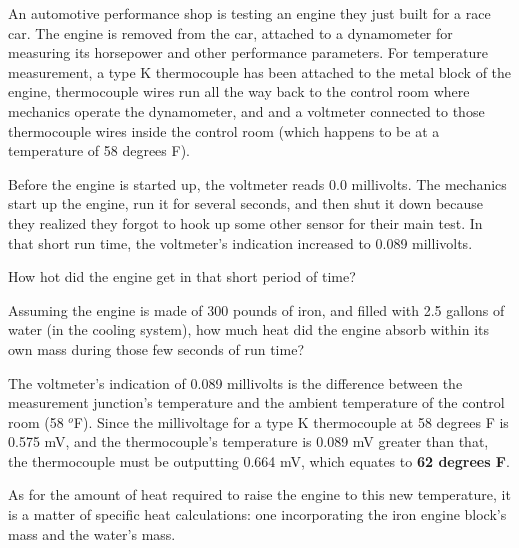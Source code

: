 

An automotive performance shop is testing an engine they just built for a race car.  The engine is removed from the car, attached to a dynamometer for measuring its horsepower and other performance parameters.  For temperature measurement, a type K thermocouple has been attached to the metal block of the engine, thermocouple wires run all the way back to the control room where mechanics operate the dynamometer, and and a voltmeter connected to those thermocouple wires inside the control room (which happens to be at a temperature of 58 degrees F).

\vskip 10pt

Before the engine is started up, the voltmeter reads 0.0 millivolts.  The mechanics start up the engine, run it for several seconds, and then shut it down because they realized they forgot to hook up some other sensor for their main test.  In that short run time, the voltmeter's indication increased to 0.089 millivolts.

\vskip 10pt

How hot did the engine get in that short period of time?

\vskip 10pt

Assuming the engine is made of 300 pounds of iron, and filled with 2.5 gallons of water (in the cooling system), how much heat did the engine absorb within its own mass during those few seconds of run time?







The voltmeter's indication of 0.089 millivolts is the difference between the measurement junction's temperature and the ambient temperature of the control room (58 $^{o}$F).  Since the millivoltage for a type K thermocouple at 58 degrees F is 0.575 mV, and the thermocouple's temperature is 0.089 mV greater than that, the thermocouple must be outputting 0.664 mV, which equates to {\bf 62 degrees F}.

\vskip 10pt

As for the amount of heat required to raise the engine to this new temperature, it is a matter of specific heat calculations: one incorporating the iron engine block's mass and the water's mass.

